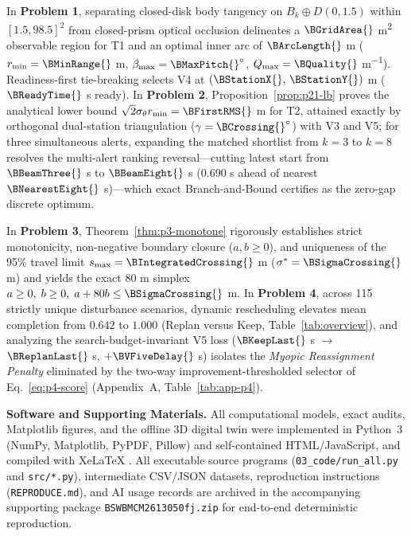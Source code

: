 In \textbf{Problem 1}, separating closed-disk body tangency on $B_k\oplus D(0,1.5)$ within $[1.5,98.5]^2$ from closed-prism optical occlusion delineates a $\BGridArea{}$ m\textsuperscript{2} observable region for T1 and an optimal inner arc of $\BArcLength{}$ m ($r_{\min}=\BMinRange{}$ m, $\beta_{\max}=\BMaxPitch{}^\circ$, $Q_{\max}=\BQuality{}$ m\textsuperscript{$-1$}). Readiness-first tie-breaking selects V4 at $(\BStationX{},\,\BStationY{})$ m ($\BReadyTime{}$ s ready). In \textbf{Problem 2}, Proposition~\ref{prop:p21-lb} proves the analytical lower bound $\sqrt{2}\sigma_\theta r_{\min}=\BFirstRMS{}$ m for T2, attained exactly by orthogonal dual-station triangulation ($\gamma=\BCrossing{}^\circ$) with V3 and V5; for three simultaneous alerts, expanding the matched shortlist from $k=3$ to $k=8$ resolves the multi-alert ranking reversal—cutting latest start from $\BBeamThree{}$ s to $\BBeamEight{}$ s ($0.690$ s ahead of nearest $\BNearestEight{}$ s)—which exact Branch-and-Bound certifies as the zero-gap discrete optimum.

In \textbf{Problem 3}, Theorem~\ref{thm:p3-monotone} rigorously establishes strict monotonicity, non-negative boundary closure ($a,b\ge 0$), and uniqueness of the 95\% travel limit $s_{\max}=\BIntegratedCrossing{}$ m ($\sigma^*=\BSigmaCrossing{}$ m) and yields the exact 80 m simplex $a\ge 0,\;b\ge 0,\;a+80b\le\BSigmaCrossing{}$ m. In \textbf{Problem 4}, across 115 strictly unique disturbance scenarios, dynamic rescheduling elevates mean completion from $0.642$ to $1.000$ (Replan versus Keep, Table~\ref{tab:overview}), and analyzing the search-budget-invariant V5 loss ($\BKeepLast{}$ s $\to$ $\BReplanLast{}$ s, $+\BVFiveDelay{}$ s) isolates the \emph{Myopic Reassignment Penalty} eliminated by the two-way improvement-thresholded selector of Eq.~\eqref{eq:p4-score} (Appendix~A, Table~\ref{tab:app-p4}).

\textbf{Software and Supporting Materials.} All computational models, exact audits, Matplotlib figures, and the offline 3D digital twin were implemented in Python~3 (NumPy, Matplotlib, PyPDF, Pillow) and self-contained HTML/JavaScript, and compiled with XeLaTeX \cite{archivedai,antigravityai}. All executable source programs (\texttt{03\_code/run\_all.py} and \texttt{src/*.py}), intermediate CSV/JSON datasets, reproduction instructions (\texttt{REPRODUCE.md}), and AI usage records are archived in the accompanying supporting package \texttt{BSWBMCM2613050fj.zip} for end-to-end deterministic reproduction.
